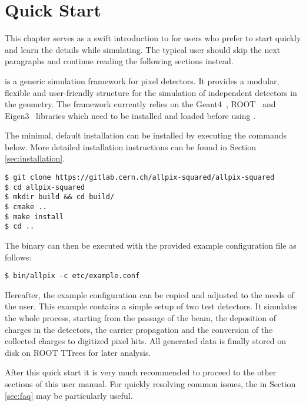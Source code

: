\section{Quick Start}
This chapter serves as a swift introduction to \apsq for users who prefer to start quickly and learn the details while simulating.
The typical user should skip the next paragraphs and continue reading the following sections instead.

\apsq is a generic simulation framework for pixel detectors.
It provides a modular, flexible and user-friendly structure for the simulation of independent detectors in the geometry.
The framework currently relies on the Geant4~\cite{geant4}, ROOT~\cite{root} and Eigen3~\cite{eigen3} libraries which need to be installed and loaded before using \apsq.

The minimal, default installation can be installed by executing the commands below.
More detailed installation instructions can be found in Section \ref{sec:installation}.

\begin{verbatim}
$ git clone https://gitlab.cern.ch/allpix-squared/allpix-squared
$ cd allpix-squared
$ mkdir build && cd build/
$ cmake ..
$ make install
$ cd ..
\end{verbatim}
The binary can then be executed with the provided example configuration file as follows:
\begin{verbatim}
$ bin/allpix -c etc/example.conf
\end{verbatim}

Hereafter, the example configuration can be copied and adjusted to the needs of the user.
This example contains a simple setup of two test detectors.
It simulates the whole process, starting from the passage of the beam, the deposition of charges in the detectors, the carrier propagation and the conversion of the collected charges to digitized pixel hits.
All generated data is finally stored on disk on ROOT TTrees for later analysis.

After this quick start it is very much recommended to proceed to the other sections of this user manual.
For quickly resolving common issues, the  in Section \ref{sec:faq} may be particularly useful.
